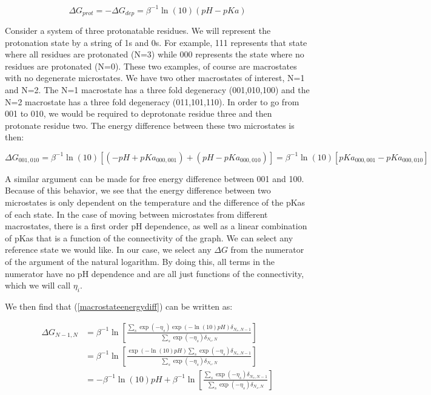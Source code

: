 \begin{equation}
  \Delta G_{prot} = -\Delta G_{dep} = \beta^{-1} \ln(10)(pH-pKa)
\end{equation}

Consider a system of three protonatable residues. We will represent
the protonation state by a string of 1s and 0s. For example, 111
represents that state where all residues are protonated (N=3) while
000 represents the state where no residues are protonated (N=0). These
two examples, of course are macrostates with no degenerate
microstates. We have two other macrostates of interest, N=1 and
N=2. The N=1 macrostate has a three fold degeneracy (001,010,100) and
the N=2 macrostate has a three fold degeneracy (011,101,110). In order
to go from 001 to 010, we would be required to deprotonate residue
three and then protonate residue two. The energy difference between
these two microstates is then:

\begin{equation}
  \Delta G_{001,010} = \beta^{-1} \ln(10)\left[ (-pH + pKa_{000,001}) + (pH - pKa_{000,010}) \right] = \beta^{-1} \ln(10) \left[ pKa_{000,001} - pKa_{000,010}\right]
\end{equation}

A similar argument can be made for free energy difference between 001
and 100. Because of this behavior, we see that the energy difference
between two microstates is only dependent on the temperature and the
difference of the pKas of each state. In the case of moving between
microstates from different macrostates, there is a first order pH
dependence, as well as a linear combination of pKas that is a function
of the connectivity of the graph. We can select any reference state we
would like. In our case, we select any $\Delta G$ from the numerator
of the argument of the natural logarithm. By doing this, all terms in
the numerator have no pH dependence and are all just functions of the
connectivity, which we will call $\eta_i$.

We then find that (\ref{macrostateenergydiff}) can be written as:

\begin{align*}
  \Delta G_{N-1,N} &= \beta^{-1} \ln \left[ \frac{\sum_s \exp(-\eta_s) \exp(-\ln(10)pH) \delta_{N_s,N-1}}{\sum_s \exp(-\eta_s) \delta_{N_s,N}} \right] \\
  &= \beta^{-1} \ln \left[ \frac{\exp( - \ln(10)pH) \sum_s \exp(-\eta_s) \delta_{N_s,N-1}}{\sum_s \exp(-\eta_s) \delta_{N_s,N}} \right] \\
  &= - \beta^{-1} \ln(10) pH + \beta^{-1} \ln \left[ \frac{\sum_s \exp(-\eta_s) \delta_{N_s,N-1}}{\sum_s \exp(- \eta_s) \delta_{N_s,N}} \right] 
\end{align*}

